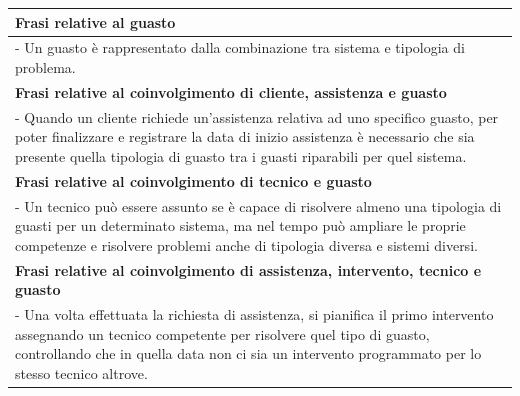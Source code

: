 \documentclass[legalpaper]{article}
\begin{document}
\begin{tabular}{ |p{16 cm}| }
\hline
\textbf{Frasi relative al guasto}  \\
\hline
- Un guasto è rappresentato dalla combinazione tra sistema e tipologia di problema.\\
\hline
\textbf{Frasi relative al coinvolgimento di cliente, assistenza e guasto}  \\
\hline
- Quando un cliente richiede un'assistenza relativa ad uno specifico guasto, per poter finalizzare e registrare la data di inizio assistenza è necessario che sia presente quella tipologia di guasto tra i guasti riparabili per quel sistema.\\
\hline
\textbf{Frasi relative al coinvolgimento di tecnico e guasto}  \\
\hline
- Un tecnico può essere assunto se è capace di risolvere almeno una tipologia di guasti per un determinato sistema, ma nel tempo può ampliare le proprie competenze e risolvere problemi anche di tipologia diversa e sistemi diversi.\\
\hline


\textbf{Frasi relative al coinvolgimento di assistenza, intervento, tecnico e guasto}  \\
\hline
- Una volta effettuata la richiesta di assistenza, si pianifica il primo intervento assegnando un tecnico competente per risolvere quel tipo di guasto, controllando che in quella data non ci sia un intervento programmato per lo stesso tecnico altrove.\\
\hline
\end{tabular}
\end{document}
